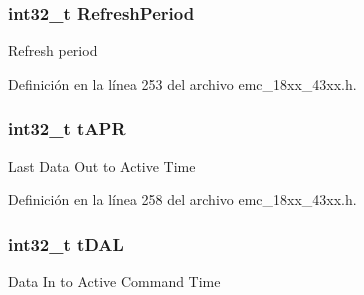 \subsubsection[{\texorpdfstring{Refresh\+Period}{RefreshPeriod}}]{\setlength{\rightskip}{0pt plus 5cm}int32\+\_\+t Refresh\+Period}\hypertarget{struct_i_p___e_m_c___d_y_n___c_o_n_f_i_g___t_a47d9c97198af7993a8f477512cd782cf}{}\label{struct_i_p___e_m_c___d_y_n___c_o_n_f_i_g___t_a47d9c97198af7993a8f477512cd782cf}
Refresh period 

Definición en la línea 253 del archivo emc\+\_\+18xx\+\_\+43xx.\+h.

\subsubsection[{\texorpdfstring{t\+A\+PR}{tAPR}}]{\setlength{\rightskip}{0pt plus 5cm}int32\+\_\+t t\+A\+PR}\hypertarget{struct_i_p___e_m_c___d_y_n___c_o_n_f_i_g___t_a42d3ffbf4505ece7a1dcacedf1bafdd6}{}\label{struct_i_p___e_m_c___d_y_n___c_o_n_f_i_g___t_a42d3ffbf4505ece7a1dcacedf1bafdd6}
Last Data Out to Active Time 

Definición en la línea 258 del archivo emc\+\_\+18xx\+\_\+43xx.\+h.

\subsubsection[{\texorpdfstring{t\+D\+AL}{tDAL}}]{\setlength{\rightskip}{0pt plus 5cm}int32\+\_\+t t\+D\+AL}\hypertarget{struct_i_p___e_m_c___d_y_n___c_o_n_f_i_g___t_a63697e010db070a2206e8a7af67349b8}{}\label{struct_i_p___e_m_c___d_y_n___c_o_n_f_i_g___t_a63697e010db070a2206e8a7af67349b8}
Data In to Active Command Time 

